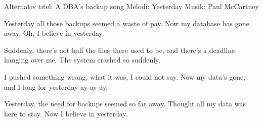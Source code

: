 \begin{song}


\begin{songmeta}
Alternativ titel: A DBA's backup song
Melodi: Yesterday
Musik: Paul McCartney
\end{songmeta}

\begin{songtext}
Yesterday
all those backups seemed a waste of pay.
Now my database has gone away.
Oh, I believe in yesterday.

Suddenly,
there's not half the files there used to be,
and there's a deadline hanging over me.
The system crashed so suddenly.

I pushed something wrong,
what it was, I could not say.
Now my data's gone,
and I long for yesterday-ay-ay-ay.

Yesterday,
the need for backups seemed so far away.
Thought all my data was here to stay.
Now I believe in yesterday.
\end{songtext}

\end{song}
